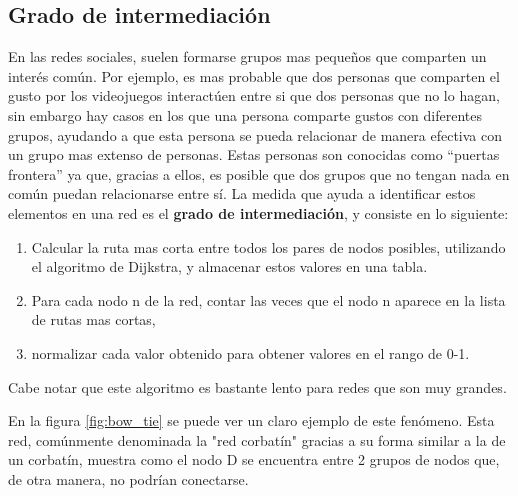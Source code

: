 \subsection{Grado de intermediación}

En las redes sociales, suelen formarse grupos mas pequeños que comparten un interés común. Por ejemplo, es mas probable que dos personas que comparten el gusto por los videojuegos interactúen entre si que dos personas que no lo hagan, sin embargo hay casos en los que una persona comparte gustos con diferentes grupos, ayudando a que esta persona se pueda relacionar de manera efectiva con un grupo mas extenso de personas. Estas personas son conocidas como ``puertas frontera'' ya que, gracias a ellos, es posible que dos grupos que no tengan nada en común puedan relacionarse entre sí. La medida que ayuda a identificar estos elementos en una red es el \textbf{grado de intermediación}, y consiste en lo siguiente:

\begin{enumerate}
  \item Calcular la ruta mas corta entre todos los pares de nodos posibles, utilizando el algoritmo de Dijkstra, y almacenar estos valores en una tabla.
  \item Para cada nodo n de la red, contar las veces que el nodo n aparece en la lista de rutas mas cortas,
  \item normalizar cada valor obtenido para obtener valores en el rango de 0-1.
\end{enumerate}

Cabe notar que este algoritmo es bastante lento para redes que son muy grandes.

En la figura \ref{fig:bow_tie} se puede ver un claro ejemplo de este fenómeno. Esta red, comúnmente denominada la "red corbatín" gracias a su forma similar a la de un corbatín, muestra como el nodo D se encuentra entre 2 grupos de nodos que, de otra manera, no podrían conectarse.

